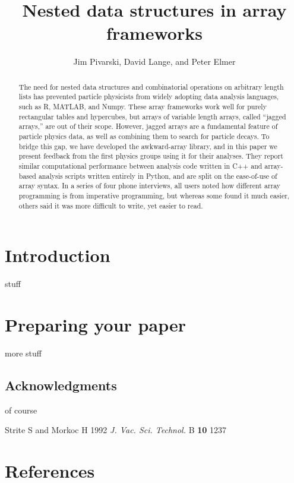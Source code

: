 \documentclass[a4paper]{jpconf}
\begin{document}
\title{Nested data structures in array frameworks}

\author{Jim Pivarski, David Lange, and Peter Elmer}

\address{Princeton University}


\begin{abstract}
The need for nested data structures and combinatorial operations on arbitrary length lists has prevented particle physicists from widely adopting data analysis languages, such as R, MATLAB, and Numpy. These array frameworks work well for purely rectangular tables and hypercubes, but arrays of variable length arrays, called ``jagged arrays,'' are out of their scope. However, jagged arrays are a fundamental feature of particle physics data, as well as combining them to search for particle decays. To bridge this gap, we have developed the awkward-array library, and in this paper we present feedback from the first physics groups using it for their analyses. They report similar computational performance between analysis code written in C++ and array-based analysis scripts written entirely in Python, and are split on the ease-of-use of array syntax. In a series of four phone interviews, all users noted how different array programming is from imperative programming, but whereas some found it much easier, others said it was more difficult to write, yet easier to read.
\end{abstract}

\section{Introduction}

stuff\cite{2019EPJWC}

\section{Preparing your paper}

more stuff

\subsection{Acknowledgments}

of course

\medskip
\begin{thebibliography}{9}
\item Strite S and Morkoc H 1992 {\it J. Vac. Sci. Technol.} B {\bf 10} 1237 
\end{thebibliography}
\smallskip

\section*{References}
{}

\end{document}
